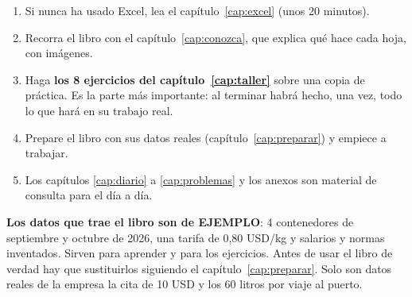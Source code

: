\begin{enumerate}
  \item Si nunca ha usado Excel, lea el capítulo~\ref{cap:excel} (unos 20 minutos).
  \item Recorra el libro con el capítulo~\ref{cap:conozca}, que explica qué hace cada hoja, con imágenes.
  \item Haga \textbf{los 8 ejercicios del capítulo~\ref{cap:taller}} sobre una copia de práctica. Es la parte más importante:
        al terminar habrá hecho, una vez, todo lo que hará en su trabajo real.
  \item Prepare el libro con sus datos reales (capítulo~\ref{cap:preparar}) y empiece a trabajar.
  \item Los capítulos \ref{cap:diario} a \ref{cap:problemas} y los anexos son material de consulta para el día a día.
\end{enumerate}

\begin{atencion}
\textbf{Los datos que trae el libro son de EJEMPLO}: 4 contenedores de septiembre y octubre de 2026, una tarifa de 0,80 USD/kg y
salarios y normas inventados. Sirven para aprender y para los ejercicios. Antes de usar el libro de verdad hay que sustituirlos
siguiendo el capítulo~\ref{cap:preparar}. Solo son datos reales de la empresa la cita de 10 USD y los 60 litros por viaje al puerto.
\end{atencion}
